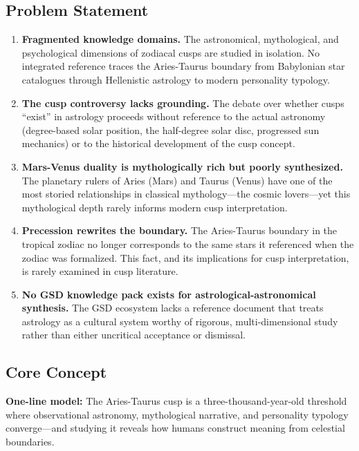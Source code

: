 \documentclass[11pt,letterpaper]{article}
\begin{document}
\subsection{Problem Statement}

\begin{enumerate}[leftmargin=2em]
\item \textbf{Fragmented knowledge domains.} The astronomical, mythological, and psychological dimensions of zodiacal cusps are studied in isolation. No integrated reference traces the Aries-Taurus boundary from Babylonian star catalogues through Hellenistic astrology to modern personality typology.

\item \textbf{The cusp controversy lacks grounding.} The debate over whether cusps ``exist'' in astrology proceeds without reference to the actual astronomy (degree-based solar position, the half-degree solar disc, progressed sun mechanics) or to the historical development of the cusp concept.

\item \textbf{Mars-Venus duality is mythologically rich but poorly synthesized.} The planetary rulers of Aries (Mars) and Taurus (Venus) have one of the most storied relationships in classical mythology---the cosmic lovers---yet this mythological depth rarely informs modern cusp interpretation.

\item \textbf{Precession rewrites the boundary.} The Aries-Taurus boundary in the tropical zodiac no longer corresponds to the same stars it referenced when the zodiac was formalized. This fact, and its implications for cusp interpretation, is rarely examined in cusp literature.

\item \textbf{No GSD knowledge pack exists for astrological-astronomical synthesis.} The GSD ecosystem lacks a reference document that treats astrology as a cultural system worthy of rigorous, multi-dimensional study rather than either uncritical acceptance or dismissal.
\end{enumerate}

\subsection{Core Concept}

\begin{quotebox}
\textbf{One-line model:} The Aries-Taurus cusp is a three-thousand-year-old threshold where observational astronomy, mythological narrative, and personality typology converge---and studying it reveals how humans construct meaning from celestial boundaries.
\end{quotebox}
\end{document}
